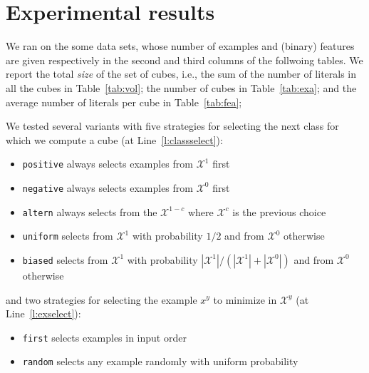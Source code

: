 \documentclass{article}
\newcommand{\setex}[1]{\ensuremath{{\mathcal X}^{#1}}\xspace}
\newcommand{\posex}{{\setex{1}}}
\newcommand{\negex}{{\setex{0}}}
\newcommand{\var}{\ensuremath{x}}
\newcommand{\ex}{\ensuremath{\var}}
\begin{document}
\section*{Experimental results}

We ran \explain on the some data sets, whose number of examples and (binary) features are given respectively in the second and third columns of the follwoing tables. We report the total \emph{size} of the set of cubes, i.e., the sum of the number of literals in all the cubes in Table~\ref{tab:vol}; the number of cubes in Table~\ref{tab:exa}; and the average number of literals per cube in Table~\ref{tab:fea};

We tested several variants with five strategies for selecting the next class for which we compute a cube (at Line~\ref{l:classselect}):
\begin{itemize}
	\item \texttt{positive} always selects examples from $\posex$ first
		\item \texttt{negative} always selects examples from $\negex$ first
	\item \texttt{altern} always selects from the $\setex{1-c}$ where $\setex{c}$ is the previous choice
\item \texttt{uniform} selects from $\posex$ with probability $1/2$ and from $\negex$ otherwise
\item \texttt{biased} selects from $\posex$ with probability $|\posex|/(|\posex|+|\negex|)$ and from $\negex$ otherwise
\end{itemize}
and two strategies for selecting the example $\ex^y$ to minimize in $\setex{y}$ (at Line~\ref{l:exselect}):
\begin{itemize}
	\item \texttt{first} selects examples in input order
	\item \texttt{random} selects any example randomly with uniform probability
\end{itemize}

\end{document}
